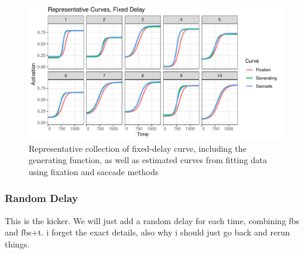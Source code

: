 \documentclass{article}
\begin{document}
\begin{figure}[h]
\centering
\includegraphics{fixed_pb_curves.pdf}
\caption{Representative collection of fixed-delay curve, including  the generating function, as well as estimated curves from fitting data using fixation and saccade methods}
\label{fig:fixed_pb_curves}
\end{figure}




\subsubsection{Random Delay}

This is the kicker. We will just add a random delay for each time, combining fbs and fbs+t. i forget the exact details, also why i should just go back and rerun things.
\end{document}
